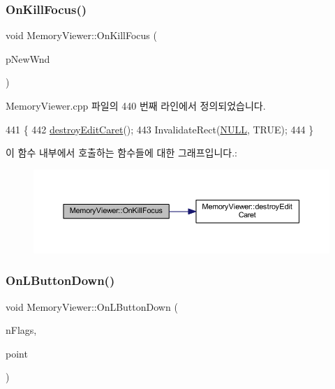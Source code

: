 \subsubsection{\texorpdfstring{On\+Kill\+Focus()}{OnKillFocus()}}
{\footnotesize\ttfamily void Memory\+Viewer\+::\+On\+Kill\+Focus (\begin{DoxyParamCaption}\item[{C\+Wnd $\ast$}]{p\+New\+Wnd }\end{DoxyParamCaption})\hspace{0.3cm}{\ttfamily [protected]}}



Memory\+Viewer.\+cpp 파일의 440 번째 라인에서 정의되었습니다.


\begin{DoxyCode}
441 \{
442   \mbox{\hyperlink{class_memory_viewer_ab658d89232d31d190ac4e323d61c4b8f}{destroyEditCaret}}();
443   InvalidateRect(\mbox{\hyperlink{getopt1_8c_a070d2ce7b6bb7e5c05602aa8c308d0c4}{NULL}}, TRUE);
444 \}
\end{DoxyCode}
이 함수 내부에서 호출하는 함수들에 대한 그래프입니다.\+:
\nopagebreak
\begin{figure}[H]
\begin{center}
\leavevmode
\includegraphics[width=350pt]{class_memory_viewer_af513c221df2a84b02c4172213cdbeec1_cgraph}
\end{center}
\end{figure}
\mbox{\label{class_memory_viewer_aa17edb0fbc507fe79493ec235cd124f2}} 
\subsubsection{\texorpdfstring{On\+L\+Button\+Down()}{OnLButtonDown()}}
{\footnotesize\ttfamily void Memory\+Viewer\+::\+On\+L\+Button\+Down (\begin{DoxyParamCaption}\item[{U\+I\+NT}]{n\+Flags,  }\item[{C\+Point}]{point }\end{DoxyParamCaption})\hspace{0.3cm}{\ttfamily [protected]}}



